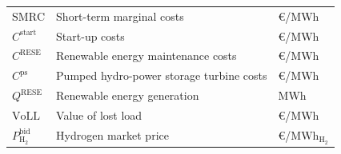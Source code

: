 \documentclass[final,10pt]{elsarticle}
\begin{document}
\begin{table}[H]
\begin{tabular}{lll}
$\mathrm{SMRC}$                                & Short-term marginal costs                              & \euro/MWh                  \\
$C^{\mathrm{start}}$                           & Start-up costs                                         & \euro/MWh                  \\
$ C^{\mathrm{RESE}}$              & Renewable energy maintenance costs                     & \euro/MWh                  \\
$C^{\mathrm{ps}}$                              & Pumped hydro-power storage turbine costs               & \euro/MWh                  \\
$Q^{\mathrm{RESE}}$                            & Renewable energy generation                            & MWh                        \\
$\mathrm{VoLL}$                                & Value of lost load                                     & \euro/MWh                  \\
$P^\mathrm{bid}_{\mathrm{H_2}}$                & Hydrogen market price                                  & \euro/$\mathrm{MWh_{H_2}}$ \\
\end{tabular}%

\end{table}
\end{document}
